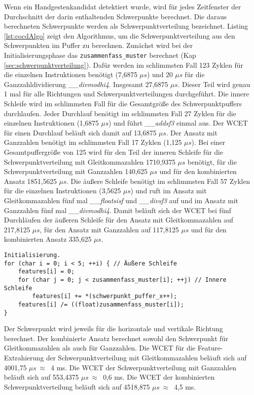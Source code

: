 Wenn ein Handgestenkandidat detektiert wurde, wird für jedes Zeitfenster der Durchschnitt der darin enthaltenden Schwerpunkte berechnet. Die daraus berechneten Schwerpunkte werden als Schwerpunktverteilung bezeichnet.
Listing \ref{lst:cocdAlgo} zeigt den Algorithmus, um die Schwerpunktverteilung aus den Schwerpunkten im Puffer zu berechnen. Zunächst wird bei der Initialisierungsphase das \texttt{zusammenfass\_muster} berechnet
(Kap \ref{sec:schwerpunktverteilung}). Dafür werden im schlimmsten Fall 123 Zyklen für die einzelnen Instruktionen benötigt (7,6875 $\mu s$) und 20 $\mu s$ für die Ganzzahldividierung \textit{\_\_divmodhi4}. Insgesamt
27,6875 $\mu s$. Dieser Teil wird genau 1 mal für alle Richtungen und Schwerpunktverteilungen durchgeführt. Die innere Schleife wird im schlimmsten Fall für die Gesamtgröße des Schwerpunktpuffers durchlaufen.
Jeder Durchlauf benötigt im schlimmsten Fall 27 Zyklen für die einzelnen Instruktionen (1,6875 $\mu s$) und führt \textit{\_\_addsf3} einmal aus. Der WCET für einen Durchlauf beläuft sich damit auf 13,6875 $\mu s$.
Der Ansatz mit Ganzzahlen benötigt im schlimmsten Fall 17 Zyklen (1,125 $\mu s$). Bei einer Gesamtpuffergröße von 125 wird für den Teil der inneren Schleife für die Schwerpunktverteilung mit Gleitkommazahlen
1710,9375 $\mu s$ benötigt, für die Schwerpunktverteilung mit Ganzzahlen 140,625 $\mu s$ und für den kombinierten Ansatz 1851,5625 $\mu s$. Die äußere Schleife benötigt im schlimmsten Fall 57 Zyklen für die einzelnen
Instruktionen (3,5625 $\mu s$) und ruft im Ansatz mit Gleitkommazahlen fünf mal \textit{\_\_floatsisf} und \textit{\_\_divsf3} auf und im Ansatz mit Ganzzahlen fünf mal \textit{\_\_divmodhi4}. Damit beläuft sich der WCET
bei fünf Durchläufen der äußeren Schleife für den Ansatz mit Gleitkommazahlen auf 217,8125 $\mu s$, für den Ansatz mit Ganzzahlen auf 117,8125 $\mu s$ und für den kombinierten Ansatz 335,625 $\mu s$.
\begin{lstlisting}[label=lst:cocdAlgo,caption={Algorithmus um die Schwerpunktverteilung in horizontaler Richtung zu berechnen.}]
Initialisierung.
for (char i = 0; i < 5; ++i) { // Äußere Schleife
    features[i] = 0;
    for (char j = 0; j < zusammenfass_muster[i]; ++j) // Innere Schleife
        features[i] += *(schwerpunkt_puffer_x++);
    features[i] /= ((float)zusammenfass_muster[i]);
}
\end{lstlisting}
Der Schwerpunkt wird jeweils für die horizontale und vertikale Richtung berechnet. Der kombinierte Ansatz berechnet sowohl den Schwerpunkt für Gleitkommazahlen als auch für Ganzzahlen. Die WCET für die Feature-Extrahierung
der Schwerpunktverteilung mit Gleitkommazahlen beläuft sich auf 4001,75 $\mu s\ \approx\ $ 4 ms. Die WCET der Schwerpunktverteilung mit Ganzzahlen beläuft sich auf 553,4375 $\mu s\ \approx\ $ 0,6 ms. Die WCET der kombinierten
Schwerpunktverteilung beläuft sich auf 4518,875 $\mu s\ \approx\ $ 4,5 ms.
